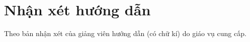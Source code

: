 \chapter*{Nhận xét hướng dẫn}
\label{thanks}

Theo bản nhận xét của giảng viên hướng dẫn (có chữ kí) do giáo vụ cung cấp.